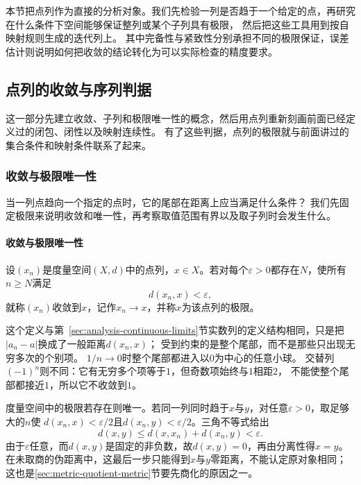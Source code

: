 本节把点列作为直接的分析对象。我们先检验一列是否趋于一个给定的点，再研究在什么条件下空间能够保证整列或某个子列具有极限，
然后把这些工具用到按自映射规则生成的迭代列上。
其中完备性与紧致性分别承担不同的极限保证，误差估计则说明如何把收敛的结论转化为可以实际检查的精度要求。

\subsection{点列的收敛与序列判据}
\label{sec:metric-convergent-sequences}

这一部分先建立收敛、子列和极限唯一性的概念，然后用点列重新刻画前面已经定义过的闭包、闭性以及映射连续性。
有了这些判据，点列的极限就与前面讲过的集合条件和映射条件联系了起来。

\subsubsection{收敛与极限唯一性}
\label{sec:metric-convergence-and-uniqueness}

当一列点趋向一个指定的点时，它的尾部在距离上应当满足什么条件？
我们先固定极限来说明收敛和唯一性，再考察取值范围有界以及取子列时会发生什么。

\paragraph{收敛与极限唯一性}

\begin{definition}[点列收敛]
\label{def:metric-convergence}
设$(x_n)$是度量空间$(X,d)$中的点列，$x\in X$。若对每个$\varepsilon>0$都存在$N$，使所有$n\geq N$满足
\[
  d(x_n,x)<\varepsilon,
\]
就称$(x_n)$收敛到$x$，记作$x_n\to x$，并称$x$为该点列的极限。
\end{definition}

这个定义与第~\ref{sec:analysis-continuous-limits}节实数列的定义结构相同，只是把$|a_n-a|$换成了一般距离$d(x_n,x)$；
受到约束的是整个尾部，而不是那些只出现无穷多次的个别项。
$1/n\to0$时整个尾部都进入以$0$为中心的任意小球。
交替列$(-1)^n$则不同：它有无穷多个项等于$1$，但奇数项始终与$1$相距$2$，
不能使整个尾部都接近$1$，所以它不收敛到$1$。

度量空间中的极限若存在则唯一。若同一列同时趋于$x$与$y$，对任意$\varepsilon>0$，取足够大的$n$使
$d(x_n,x)<\varepsilon/2$且$d(x_n,y)<\varepsilon/2$。三角不等式给出
\[
  d(x,y)\leq d(x,x_n)+d(x_n,y)<\varepsilon.
\]
由于$\varepsilon$任意，而$d(x,y)$是固定的非负数，故$d(x,y)=0$，再由分离性得$x=y$。
在未取商的伪距离中，这最后一步只能得到$x$与$y$零距离，不能认定原对象相同；
这也是\ref{sec:metric-quotient-metric}节要先商化的原因之一。

